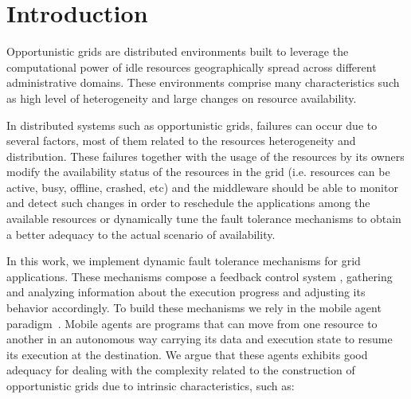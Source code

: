 \documentclass[times, 09pt, twocolumn]{article}
\begin{document}
\section{Introduction}

Opportunistic grids are distributed environments built to leverage the
computational power of idle resources geographically spread across different
administrative domains. These environments comprise many characteristics such as
high level of heterogeneity and large changes on resource availability. 

 

In distributed systems such as opportunistic grids, failures can occur due to
several factors, most of them related to the resources heterogeneity and
distribution. These failures together with the usage of the resources by its
owners modify the availability status of the resources in the grid (i.e.
resources can be active, busy, offline, crashed, etc) and the middleware should
be able to monitor and detect such changes in order to reschedule the
applications among the available resources or dynamically tune the fault
tolerance mechanisms to obtain a better adequacy to the actual scenario of
availability. 

In this work, we implement dynamic fault tolerance mechanisms for grid
applications. These mechanisms compose a feedback control system
\cite{tanenbaum02}, gathering and analyzing information about the execution
progress and adjusting its behavior accordingly. To build these mechanisms we
rely in the mobile agent paradigm~\cite{pham98}. Mobile agents are programs that can move
from one resource to another in an autonomous way carrying its data and
execution state to resume its execution at the destination. We argue that these
agents exhibits good adequacy for dealing with the complexity related to the
construction of opportunistic grids due to intrinsic characteristics, such as:
\end{document}
